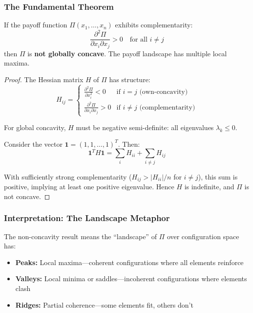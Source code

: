 \subsubsection{The Fundamental Theorem}

\begin{proposition}
\label{prop:nc-main}
If the payoff function $\Pi(x_1, \ldots, x_n)$ exhibits complementarity:
\begin{equation}
\frac{\partial^2 \Pi}{\partial x_i \partial x_j} > 0 \quad \text{for all } i \neq j
\end{equation}
then $\Pi$ is \textbf{not globally concave}. The payoff landscape has multiple local maxima.
\end{proposition}

\begin{proof}
The Hessian matrix $H$ of $\Pi$ has structure:
\begin{equation}
H_{ij} = \begin{cases}
\frac{\partial^2 \Pi}{\partial x_i^2} < 0 & \text{if } i = j \text{ (own-concavity)} \\
\frac{\partial^2 \Pi}{\partial x_i \partial x_j} > 0 & \text{if } i \neq j \text{ (complementarity)}
\end{cases}
\end{equation}

For global concavity, $H$ must be negative semi-definite: all eigenvalues $\lambda_k \leq 0$.

Consider the vector $\mathbf{1} = (1, 1, \ldots, 1)^T$. Then:
\begin{equation}
\mathbf{1}^T H \mathbf{1} = \sum_i H_{ii} + \sum_{i \neq j} H_{ij}
\end{equation}

With sufficiently strong complementarity ($H_{ij} > |H_{ii}|/n$ for $i \neq j$), this sum is positive, implying at least one positive eigenvalue. Hence $H$ is indefinite, and $\Pi$ is not concave.
\end{proof}

\subsubsection{Interpretation: The Landscape Metaphor}

The non-concavity result means the ``landscape'' of $\Pi$ over configuration space has:

\begin{itemize}
\item \textbf{Peaks:} Local maxima---coherent configurations where all elements reinforce
\item \textbf{Valleys:} Local minima or saddles---incoherent configurations where elements clash
\item \textbf{Ridges:} Partial coherence---some elements fit, others don't
\end{itemize}

